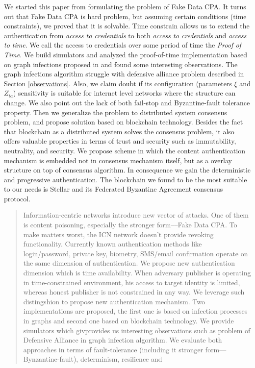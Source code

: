 \documentclass[nostrict]{szablonPG}
\begin{document}
\tableofcontents
\listoffigures


We started this paper from formulating the problem of Fake Data CPA. It turns out that Fake Data CPA is hard problem, but assuming certain conditions (time constraints), we proved that it is solvable. Time constrain allows us to extend the authentication from \textit{access to credentials} to both \textit{access to credentials} and \textit{access to time}. We call the access to credentials over some period of time the \textit{Proof of Time}. We build simulators and analyzed the proof-of-time implementation based on graph infections proposed in \cite{jekon2019content} and found some interesting observations. The graph infections algorithm struggle with defensive alliance problem described in Section \ref{observations}. Also, we claim doubt if its configuration (parameters $\xi$ and $Z_{ia}$) sensitivity is suitable for internet level networks where the structure can change. We also point out the lack of both fail-stop and Byzantine-fault tolerance property. Then we generalize the problem to distributed system consensus problem, and propose solution based on blockchain technology. Besides the fact that blockchain as a distributed system solves the consensus problem, it also offers valuable properties in terms of trust and security such as immutability, neutrality, and security. We propose scheme in which the content authentication mechanism is embedded not in consensus mechanism itself, but as a overlay structure on top of consensus algorithm. In consequence we gain the deterministic and progressive authentication. The blockchain we found to be the most suitable to our needs is Stellar and its Federated Byzantine Agreement consensus protocol. 

\begin{abstract}
Information-centric networks introduce new vector of attacks. One of them is content poisoning, especially the stronger form––Fake Data CPA. To make matters worst, the ICN network doesn't provide revoking functionality. Currently known authentication methods like login/password, private key, biometry, SMS/email confirmation operate on the same dimension of authentication. We propose new authentication dimension which is time availability. When adversary publisher is operating in time-constrained environment, his access to target identity is limited, whereas honest publisher is not constrained in any way. We leverage such distingshion to propose new authentication mechanism.
Two implementations are proposed, the first one is based on infection processes in graphs and second one based on blockchain technology. We provide simulators which givprovides us interesting observations such as problem of Defensive Alliance in graph infection algorithm. We evaluate both approaches in terms of fault-tolerance (including it stronger form––Bynzantine-fault), determinism, resilience and 


\end{abstract}
\end{document}
